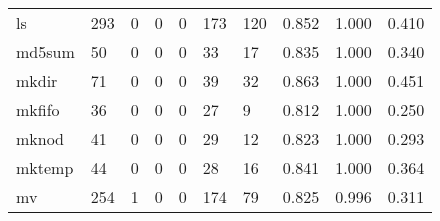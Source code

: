 \begin{longtable}{lp{1.3cm}p{1.3cm}p{1.3cm}p{1.3cm}p{1.3cm}p{1.3cm}p{1.3cm}p{1.3cm}p{1.3cm}}
ls        &                    293 &                                             0 &                                            0 &                                           0 &                                          173 &                                        120 &                                0.852 &                                  1.000 &                                0.410 \\
md5sum    &                     50 &                                             0 &                                            0 &                                           0 &                                           33 &                                         17 &                                0.835 &                                  1.000 &                                0.340 \\
mkdir     &                     71 &                                             0 &                                            0 &                                           0 &                                           39 &                                         32 &                                0.863 &                                  1.000 &                                0.451 \\
mkfifo    &                     36 &                                             0 &                                            0 &                                           0 &                                           27 &                                          9 &                                0.812 &                                  1.000 &                                0.250 \\
mknod     &                     41 &                                             0 &                                            0 &                                           0 &                                           29 &                                         12 &                                0.823 &                                  1.000 &                                0.293 \\
mktemp    &                     44 &                                             0 &                                            0 &                                           0 &                                           28 &                                         16 &                                0.841 &                                  1.000 &                                0.364 \\
mv        &                    254 &                                             1 &                                            0 &                                           0 &                                          174 &                                         79 &                                0.825 &                                  0.996 &                                0.311 \\

\end{longtable}
